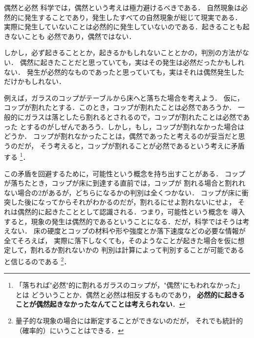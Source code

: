         \begin{memo}{偶然と必然}
            科学では，偶然という考えは極力避けるべきである．
            自然現象は必然的に発生することであり，発生したすべての自然現象が総じて現実である．
            実際に発生していないことは必然的に発生していないのである．起きることも起きないことも
            必然であり，偶然ではない．

            しかし，必ず起きることとか，起きるかもしれないこととかの，判別の方法がない．
            偶然に起きたことだと思っていても，実はその発生は必然だったかもしれない．
            発生が必然的なものであったと思っていても，実はそれは偶然発生しただけかもしれない．

            例えば，ガラスのコップがテーブルから床へと落ちた場合を考えよう．
            仮に，コップが割れたとする．このとき，コップが割れたことは必然であろうか．
            一般的にガラスは落としたら割れるとされるので，コップが割れたことは必然であった
            とするのがしぜんであろう．しかし，もし，コップが割れなかった場合はどうか．
            コップが割れなかったことは，偶然であったと考えるのが妥当だと思うのだが，
            そう考えると，コップが割れることが必然であるという考えに矛盾する
                \footnote{
                    「落ちれば"必然"的に割れるガラスのコップが，"偶然"にもわれなかった」とは
                    どういうことか．偶然と必然は相反するものであり，
                    \textbf{必然的に起きることが偶然起きなかったなんてことは考えられない}．
                }．

            この矛盾を回避するために，可能性という概念を持ち出すことがある．
            コップが落ちたとき，コップが床に到達する直前では，コップが
            割れる場合と割れれない場合の2があるが，どちらになるかの判別は全くつかない．
            コップが床に衝突した後になってからそれがわかるのだが，割れるにせよ割れないにせよ，
            それは偶然的に起きたこととして認識される．つまり，可能性という概念を
            導入すると，現象の発生は偶然的であるということになる．だが，科学ではそうは考えない．
            床の硬度とコップの材料や形や強度とか落下速度などの必要な情報が全てそろえば，
            実際に落下しなくても，そのようなことが起きた場合を仮に想定して，割れるか割れないかの
            判別は計算によって判別することが可能であると信じるのである
                \footnote{
                    量子的な現象の場合には断定することができないのだが，
                    それでも統計的（確率的）にいうことはできる．
                }．
        \end{memo}

